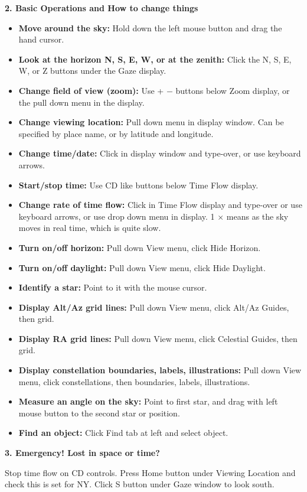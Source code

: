 \clearpage
\noindent
{\bf 2. Basic Operations and How to change things}

\smallskip
\noindent


\begin{itemize}
\item {\bf Move around the sky:}  Hold down the left mouse button and drag
 the hand cursor.

\item {\bf Look at the horizon N, S, E, W, or at the  zenith:} Click the
  N, S, E, W, or Z buttons under the Gaze display.

\item {\bf Change field of view (zoom):} Use + $-$ buttons below Zoom
  display, or the pull down menu in the display. 

\item {\bf Change viewing location:} Pull down menu in display
  window. Can be specified by place name, or by latitude and longitude.

\item {\bf Change time/date:} Click in display window and type-over,
 or use keyboard arrows. 

\item{\bf Start/stop time:} Use CD like buttons below Time Flow display.

\item {\bf Change rate of time flow:} Click in Time Flow display and type-over or
 use keyboard arrows, or use drop down menu in display. 1 $\times$
 means as the sky moves in real time, which is quite slow.


\item{\bf Turn on/off horizon:} Pull down View menu, click Hide Horizon.

\item{\bf Turn on/off daylight:} Pull down View menu, click Hide Daylight.

\item{\bf Identify a star:} Point to it with the mouse cursor.  

\item{\bf Display Alt/Az grid lines:} Pull down View menu, click
  Alt/Az Guides, then grid. 

\item{\bf Display RA grid lines:} Pull down View menu, click
  Celestial Guides, then grid. 

\item{\bf Display constellation boundaries, labels, illustrations:}
  Pull down View menu, click constellations, then boundaries, labels,
  illustrations. 


\item{\bf Measure an angle on the sky:} Point to first star, and drag with left
  mouse button to the second star or position.

\item {\bf Find an object:} Click Find tab at left and select object. 

\end{itemize}

\bigskip
\medskip
\noindent
{\bf 3. Emergency! Lost in space or time?}

\smallskip
\noindent
Stop time flow on CD controls. Press Home button under Viewing
Location and check this is set for NY. Click S button under Gaze
window to look south.  

